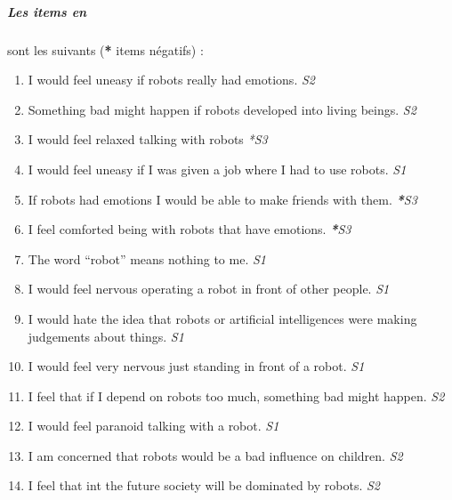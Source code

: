 \subparagraph{Les items \textit{en}} sont les suivants (\textbf{*} items négatifs) : 
\begin{enumerate}
     \item I would feel uneasy if robots really had emotions. \textit{S2}
     \item Something bad might happen if robots developed into living beings. \textit{S2}
     \item I would feel relaxed talking with robots \textit{*S3}
     \item I would feel uneasy if I was given a job where I had to use robots. \textit{S1}
     \item If robots had emotions I would be able to make friends with them. \textit{\textbf{*}S3}
     \item I feel comforted being with robots that have emotions. \textit{\textbf{*}S3}
     \item The word “robot” means nothing to me. \textit{S1}
     \item I would feel nervous operating a robot in front of other people. \textit{S1}
     \item I would hate the idea that robots or artificial intelligences were making judgements about things. \textit{S1}
     \item I would feel very nervous just standing in front of a robot. \textit{S1}
     \item I feel that if I depend on robots too much, something bad might happen. \textit{S2}
     \item I would feel paranoid talking with a robot. \textit{S1}
     \item I am concerned that robots would be a bad influence on children. \textit{S2}
     \item I feel that int the future society will be dominated by robots. \textit{S2}
 \end{enumerate}